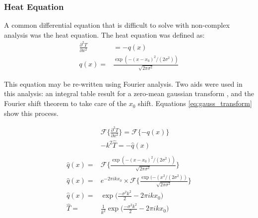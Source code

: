 \documentclass[twocolumn]{article}
\begin{document}
\subsubsection{Heat Equation}
A common differential equation that is difficult to solve with non-complex analysis was the heat equation. The heat equation was defined as:
\begin{equation}
\begin{split}
\frac{\partial^2 T}{\partial x^2} &= -q(x)\\
q(x) =& \frac{\exp(-(x-x_0)^2/(2\sigma^2))}{\sqrt{2\pi\sigma^2}}
\end{split}
\end{equation}

This equation may be re-written using Fourier analysis. Two aids were used in this analysis: an integral table result for a zero-mean gaussian transform \cite{gauss_trans}, and the Fourier shift theorem to take care of the $x_0$ shift. Equations \ref{eq:gauss_transform} show this process.

\begin{equation}
\begin{split}
&\mathcal{F}\{ \frac{\partial^2 T}{\partial x^2} \} = \mathcal{F} \{ -q(x) \} \\
&-k^2 \hat{T} = -\hat{q}(x) \\
&\\
\hat{q}(x) =& \mathcal{F} \{ \frac{\exp(-(x-x_0)^2/(2\sigma^2))}{\sqrt{2\pi\sigma^2}} \} \\
\hat{q}(x) =& e^{-2\pi ikx_0} \times \mathcal{F} \{ \frac{\exp(-(x^2/(2\sigma^2))}{\sqrt{2\pi\sigma^2}} \} \\
\hat{q}(x) =& \exp\bigg( \frac{-\sigma^2 k^2}{2} - 2\pi ikx_0 \bigg) \\
\hat{T} =& \frac{1}{k^2} \exp\bigg( \frac{-\sigma^2 k^2}{2} - 2\pi ikx_0 \bigg)
%
\end{split}
\label{eq:gauss_transform}
\end{equation}
\end{document}
